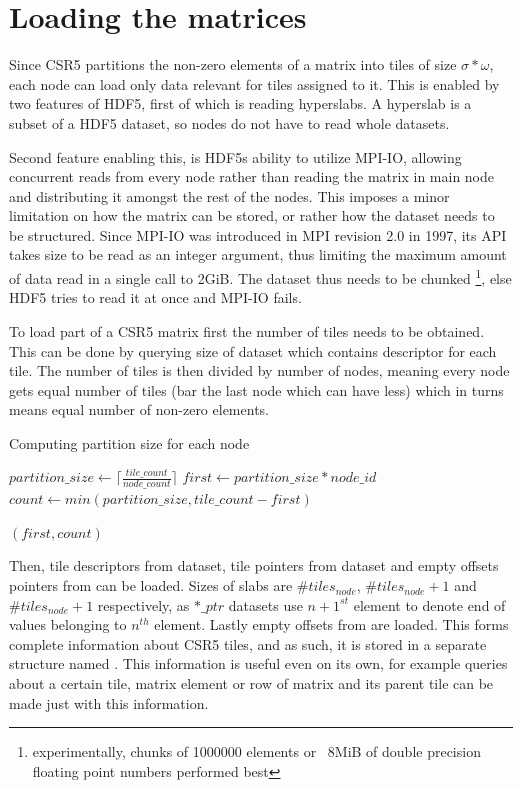 \documentclass[thesis=M,english]{FITthesis}[2019/12/23]
\begin{document}
\section{Loading the matrices}


Since CSR5 partitions the non-zero elements of a matrix into tiles of
size $\sigma * \omega$, each node can load only data relevant for tiles
assigned to it. This is enabled by two features of HDF5, first of which
is reading hyperslabs. A hyperslab is a subset of a HDF5 dataset, so
nodes do not have to read whole datasets.

Second feature enabling this, is HDF5s ability to utilize MPI-IO, allowing concurrent
reads from every node rather than reading the matrix in main node
and distributing it amongst the rest of the nodes. This imposes a minor limitation
on how the matrix can be stored, or rather how the dataset needs to be structured.
Since MPI-IO was introduced in MPI revision 2.0 \cite{mpi20} in 1997, its API takes
size to be read as an integer argument, thus limiting the maximum amount of data read
in a single call to 2GiB. The dataset thus needs to be chunked
\footnote{experimentally, chunks of 1000000 elements or ~8MiB of double precision floating
    point numbers performed best}, else HDF5 tries to read it at once and MPI-IO fails.


To load part of a CSR5 matrix first the number of tiles needs to be obtained. This can be
done by querying size of  dataset which contains descriptor for each tile.
The number of tiles is then divided by number of nodes, meaning every node gets equal
number of tiles (bar the last node which can have less) which in turns means equal number
of non-zero elements.



\begin{algorithm}
    \caption{Computing partition size for each node}
    \begin{algorithmic}
        \State $partition\_size \gets \lceil\frac{tile\_count}{node\_count}\rceil$
        \State $first \gets partition\_size * node\_id$
        \State $count \gets min(partition\_size, tile\_count - first)$

        \Return $(first, count)$
        \EndFunction
    \end{algorithmic}
\end{algorithm}

Then, tile descriptors from  dataset, tile pointers from 
dataset and empty offsets pointers from  can be loaded.
Sizes of slabs are $\#tiles_{node}$, $\#tiles_{node} + 1$ and $\#tiles_{node} + 1$
respectively, as $*\_ptr$ datasets use $n+1^{st}$ element to denote end of values
belonging to $n^{th}$ element. Lastly empty offsets from 
are loaded. This forms complete information about CSR5 tiles, and as such, it is
stored in a separate structure named . This information is useful
even on its own, for example queries about a certain tile, matrix element or row
of matrix and its parent tile can be made just with this information.
\end{document}
